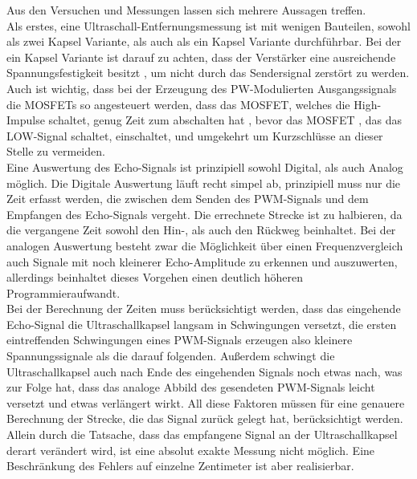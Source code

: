 Aus den Versuchen und Messungen lassen sich mehrere Aussagen treffen. \\
Als erstes, eine Ultraschall-Entfernungsmessung ist mit wenigen Bauteilen, sowohl als zwei Kapsel Variante, als auch als ein Kapsel Variante durchführbar. Bei der ein Kapsel Variante ist darauf zu achten, dass der Verstärker eine ausreichende Spannungsfestigkeit besitzt , um nicht durch das Sendersignal zerstört zu werden. Auch ist wichtig, dass bei der Erzeugung des PW-Modulierten Ausgangssignals die MOSFETs so angesteuert werden, dass das MOSFET, welches die High-Impulse schaltet, genug Zeit zum abschalten hat , bevor das MOSFET , das das LOW-Signal schaltet, einschaltet, und umgekehrt um Kurzschlüsse an dieser Stelle zu vermeiden.\\
Eine Auswertung des Echo-Signals ist prinzipiell sowohl Digital, als auch Analog möglich. Die Digitale Auswertung läuft recht simpel ab, prinzipiell muss nur die Zeit erfasst werden, die zwischen dem Senden des PWM-Signals und dem Empfangen des Echo-Signals vergeht. Die errechnete Strecke ist zu halbieren, da die vergangene Zeit sowohl den Hin-, als auch den Rückweg beinhaltet. Bei der analogen Auswertung besteht zwar die Möglichkeit über einen Frequenzvergleich auch Signale mit noch kleinerer Echo-Amplitude zu erkennen und auszuwerten, allerdings beinhaltet dieses Vorgehen einen deutlich höheren Programmieraufwandt.\\
Bei der Berechnung der Zeiten muss berücksichtigt werden, dass das eingehende Echo-Signal die Ultraschallkapsel langsam in Schwingungen versetzt, die ersten eintreffenden Schwingungen eines PWM-Signals erzeugen also kleinere Spannungssignale als die darauf folgenden. Außerdem schwingt die Ultraschallkapsel auch nach Ende des eingehenden Signals noch etwas nach, was zur Folge hat, dass das analoge Abbild des gesendeten PWM-Signals leicht versetzt und etwas verlängert wirkt. All diese Faktoren müssen für eine genauere Berechnung der Strecke, die das Signal zurück gelegt hat, berücksichtigt werden. Allein durch die Tatsache, dass das empfangene Signal an der Ultraschallkapsel derart verändert wird, ist eine absolut exakte Messung nicht möglich. Eine Beschränkung des Fehlers auf einzelne Zentimeter ist aber realisierbar.\\
